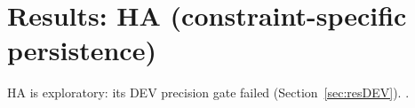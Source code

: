 \section{Results: HA (constraint-specific persistence)}\label{sec:resHA}
HA is exploratory: its DEV precision gate failed (Section~\ref{sec:resDEV}). .

